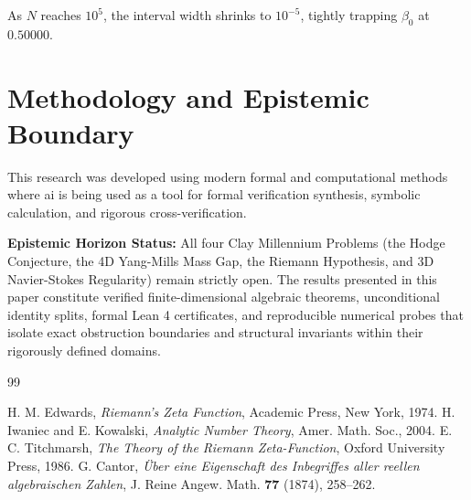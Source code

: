 \documentclass[11pt,a4paper]{article}
\theoremstyle{definition}
\begin{document}
\noindent As $N$ reaches $10^5$, the interval width shrinks to $10^{-5}$, tightly trapping $\beta_0$ at $0.50000$.


\section{Methodology and Epistemic Boundary}
\noindent This research was developed using modern formal and computational methods where ai is being used as a tool for formal verification synthesis, symbolic calculation, and rigorous cross-verification.

\vspace{0.5em}
\noindent\textbf{Epistemic Horizon Status:} All four Clay Millennium Problems (the Hodge Conjecture, the 4D Yang-Mills Mass Gap, the Riemann Hypothesis, and 3D Navier-Stokes Regularity) remain strictly open. The results presented in this paper constitute verified finite-dimensional algebraic theorems, unconditional identity splits, formal Lean 4 certificates, and reproducible numerical probes that isolate exact obstruction boundaries and structural invariants within their rigorously defined domains.

\begin{thebibliography}{99}

 H. M. Edwards, \emph{Riemann's Zeta Function}, Academic Press, New York, 1974.
 H. Iwaniec and E. Kowalski, \emph{Analytic Number Theory}, Amer. Math. Soc., 2004.
 E. C. Titchmarsh, \emph{The Theory of the Riemann Zeta-Function}, Oxford University Press, 1986.
 G. Cantor, \emph{\"Uber eine Eigenschaft des Inbegriffes aller reellen algebraischen Zahlen}, J. Reine Angew. Math. \textbf{77} (1874), 258--262.

\end{thebibliography}
\end{document}
